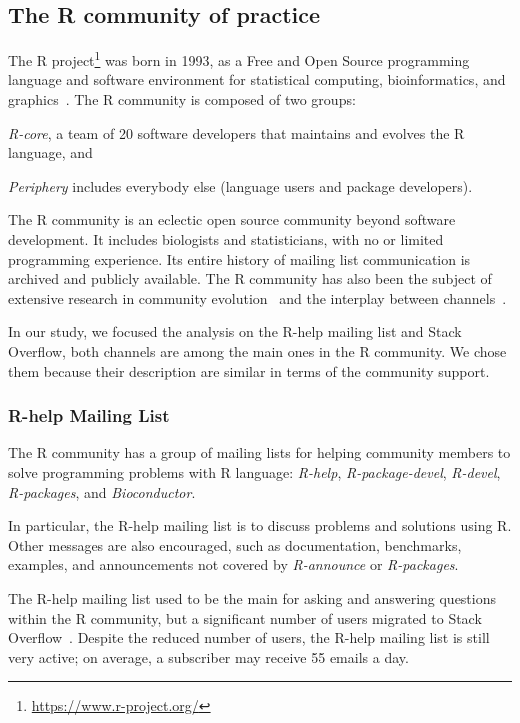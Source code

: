 \subsection{The R community of practice}
    
    The R project\footnote{\url{https://www.r-project.org/}} was born in 1993, as a Free and Open Source programming language and software environment for statistical computing, bioinformatics, and graphics~\cite{Ihaka1996}.
    The R community is composed of two groups:
    \begin{enumerate*}[label=(\arabic*)]
      \item \textit{R-core}, a team of 20 software developers that maintains and evolves the R language, and
      \item \textit{Periphery} includes everybody else (language users and package developers).
    \end{enumerate*}

    The R community is an eclectic open source community beyond software development.
    It includes biologists and statisticians, with no or limited programming experience.
    Its entire history of mailing list communication is archived and publicly available.
    The R community has also been the subject of extensive research in community evolution~\cite{German2013} and the interplay between channels~\cite{Vasilescu2014c}.

    In our study, we focused the analysis on the R-help mailing list and Stack Overflow, both channels are among the main ones in the R community.
    We chose them because their description are similar in terms of the community support.

\subsubsection{R-help Mailing List}
    The R community has a group of mailing lists for helping community members to solve programming problems with R language: \emph{R-help}, \emph{R-package-devel}, \emph{R-devel}, \emph{R-packages}, and \emph{Bioconductor}.

    In particular, the R-help mailing list is to discuss problems and solutions using R. 
    Other messages are also encouraged, such as documentation, benchmarks, examples, and announcements not covered by \emph{R-announce} or \emph{R-packages}.

    The R-help mailing list used to be the main \channel for asking and answering questions within the R community, but a significant number of users migrated to Stack Overflow~\cite{Vasilescu2014c}.
    Despite the reduced number of users, the R-help mailing list is still very active; on average, a subscriber may receive 55 emails a day.

